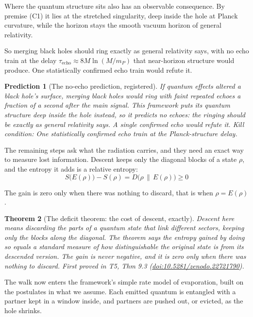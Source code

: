 \documentclass[11pt]{article}
\newtheorem{theorem}{Theorem}[section]
\newtheorem{prediction}[theorem]{Prediction}
\theoremstyle{definition}
\theoremstyle{plain}
\providecommand{\rel}{}\renewcommand{\rel}[2]{D\bigl(#1 \,\|\, #2\bigr)}
\begin{document}
Where the quantum structure sits also has an observable consequence. By premise (C1) it lies at the stretched singularity, deep inside the hole at Planck curvature, while the horizon stays the smooth vacuum horizon of general relativity.

So merging black holes should ring exactly as general relativity says, with no echo train at the delay $\tau_{\mathrm{echo}} \approx 8M\ln(M/m_P)$ that near-horizon structure would produce. One statistically confirmed echo train would refute it.

\begin{prediction}[The no-echo prediction, registered]\label{c:scrambling.no-echo-prediction-registered}
If quantum effects altered a black hole's surface, merging black holes would ring with faint repeated echoes a fraction of a second after the main signal. This framework puts its quantum structure deep inside the hole instead, so it predicts no echoes: the ringing should be exactly as general relativity says. A single confirmed echo would refute it.
\emph{Kill condition:} One statistically confirmed echo train at the Planck-structure delay.
\end{prediction}

The remaining steps ask what the radiation carries, and they need an exact way to measure lost information. Descent keeps only the diagonal blocks of a state $\rho$, and the entropy it adds is a relative entropy: \[ S\bigl(E(\rho)\bigr) - S(\rho) = \rel{\rho}{E(\rho)} \geq 0 \]

The gain is zero only when there was nothing to discard, that is when $\rho = E(\rho)$.

\begin{theorem}[The deficit theorem: the cost of descent, exactly]\label{c:singularity.deficit-theorem-cost-descent-exactly}
Descent here means discarding the parts of a quantum state that link different sectors, keeping only the blocks along the diagonal. The theorem says the entropy gained by doing so equals a standard measure of how distinguishable the original state is from its descended version. The gain is never negative, and it is zero only when there was nothing to discard.
\emph{First proved in} T5, Thm 9.3 (\href{https://doi.org/10.5281/zenodo.22721790}{doi:10.5281/zenodo.22721790}).
\end{theorem}

The walk now enters the framework's simple rate model of evaporation, built on the postulates in what we assume. Each emitted quantum is entangled with a partner kept in a window inside, and partners are pushed out, or evicted, as the hole shrinks.
\end{document}
